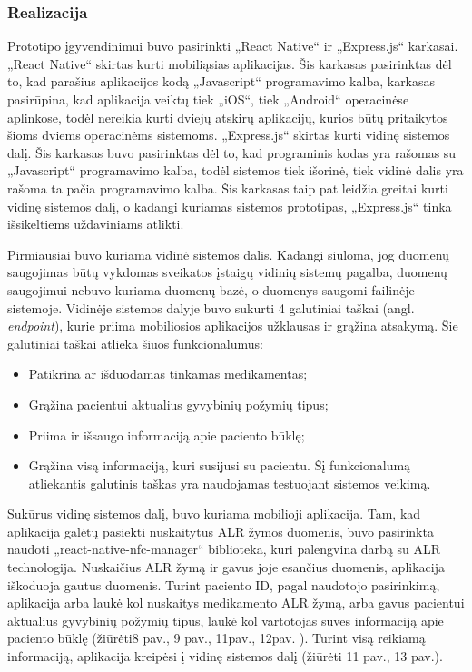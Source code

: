\subsubsection{Realizacija}
Prototipo įgyvendinimui buvo pasirinkti „React Native“ ir „Express.js“ karkasai. „React Native“ skirtas kurti mobiliąsias aplikacijas. Šis karkasas pasirinktas dėl to, kad parašius aplikacijos kodą „Javascript“ programavimo kalba, karkasas pasirūpina, kad aplikacija veiktų tiek „iOS“, tiek „Android“ operacinėse aplinkose, todėl nereikia kurti dviejų atskirų aplikacijų, kurios būtų pritaikytos šioms dviems operacinėms sistemoms. „Express.js“ skirtas kurti vidinę sistemos dalį. Šis karkasas buvo pasirinktas dėl to, kad programinis kodas yra rašomas su „Javascript“ programavimo kalba, todėl sistemos tiek išorinė, tiek vidinė dalis yra rašoma ta pačia programavimo kalba. Šis karkasas taip pat leidžia greitai kurti vidinę sistemos dalį, o kadangi kuriamas sistemos prototipas, „Express.js“ tinka išsikeltiems uždaviniams atlikti.


Pirmiausiai buvo kuriama vidinė sistemos dalis. Kadangi siūloma, jog duomenų saugojimas būtų vykdomas sveikatos įstaigų vidinių sistemų pagalba, duomenų saugojimui nebuvo kuriama duomenų bazė, o duomenys saugomi failinėje sistemoje. Vidinėje sistemos dalyje buvo sukurti 4 galutiniai taškai (angl. \textit{endpoint}), kurie priima mobiliosios aplikacijos užklausas ir grąžina atsakymą. Šie galutiniai taškai atlieka šiuos funkcionalumus: 
\begin{itemize}
    \item Patikrina ar išduodamas tinkamas medikamentas;
    \item Grąžina pacientui aktualius gyvybinių požymių tipus;
    \item Priima ir išsaugo informaciją apie paciento būklę;
    \item Grąžina visą informaciją, kuri susijusi su pacientu. Šį funkcionalumą atliekantis galutinis taškas yra naudojamas testuojant sistemos veikimą.
\end{itemize}
Sukūrus vidinę sistemos dalį, buvo kuriama mobilioji aplikacija. Tam, kad aplikacija galėtų pasiekti nuskaitytus ALR žymos duomenis, buvo pasirinkta naudoti „react-native-nfc-manager“ biblioteka, kuri palengvina darbą su ALR technologija. Nuskaičius ALR žymą ir gavus joje esančius duomenis, aplikacija iškoduoja gautus duomenis. Turint paciento ID, pagal naudotojo pasirinkimą, aplikacija arba laukė kol nuskaitys medikamento ALR žymą, arba gavus pacientui aktualius gyvybinių požymių tipus, laukė kol vartotojas suves informaciją apie paciento būklę (žiūrėti8 pav., 9 pav., 11pav., 12pav. ). Turint visą reikiamą informaciją, aplikacija kreipėsi į vidinę sistemos dalį (žiūrėti 11 pav., 13 pav.).



